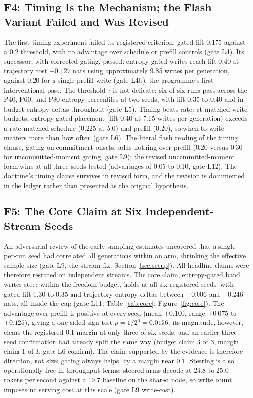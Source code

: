 \subsection{F4: Timing Is the Mechanism; the Flash Variant Failed and Was Revised}
\label{sec:results:timing}

The first timing experiment failed its registered criterion: gated lift 0.175 against a 0.2 threshold, with no advantage over schedule or prefill controls (gate L4). Its successor, with corrected gating, passed: entropy-gated writes reach lift 0.40 at trajectory cost $-0.127$ nats using approximately 9.85 writes per generation, against 0.20 for a single prefill write (gate L4b), the programme's first interventional pass. The threshold $\tau$ is not delicate: six of six runs pass across the P40, P60, and P80 entropy percentiles at two seeds, with lift 0.35 to 0.40 and in-budget entropy deltas throughout (gate L5). Timing beats rate: at matched write budgets, entropy-gated placement (lift 0.40 at 7.15 writes per generation) exceeds a rate-matched schedule (0.225 at 5.0) and prefill (0.20), so when to write matters more than how often (gate L6). The literal flash reading of the timing clause, gating on commitment onsets, adds nothing over prefill (0.20 versus 0.30 for uncommitted-moment gating, gate L9); the revised uncommitted-moment form wins at all three seeds tested (advantages of 0.05 to 0.10, gate L12). The doctrine's timing clause survives in revised form, and the revision is documented in the ledger rather than presented as the original hypothesis.

\subsection{F5: The Core Claim at Six Independent-Stream Seeds}
\label{sec:results:core}

An adversarial review of the early sampling estimates uncovered that a single per-run seed had correlated all generations within an arm, shrinking the effective sample size (gate L9, the stream fix; Section~\ref{sec:setup}). All headline claims were therefore restated on independent streams. The core claim, entropy-gated band writes steer within the freedom budget, holds at all six registered seeds, with gated lift 0.30 to 0.35 and trajectory entropy deltas between $-0.006$ and $+0.246$ nats, all inside the cap (gate L11; Table~\ref{tab:core}; Figure~\ref{fig:core}). The advantage over prefill is positive at every seed (mean $+0.100$, range $+0.075$ to $+0.125$), giving a one-sided sign-test $p = 1/2^6 = 0.0156$; its magnitude, however, clears the registered 0.1 margin at only three of six seeds, and an earlier three-seed confirmation had already split the same way (budget claim 3 of 3, margin claim 1 of 3, gate L6 confirm). The claim supported by the evidence is therefore direction, not size: gating always helps, by a margin near 0.1. Steering is also operationally free in throughput terms: steered arms decode at 24.8 to 25.0 tokens per second against a 19.7 baseline on the shared node, so write count imposes no serving cost at this scale (gate L9 write-cost).

